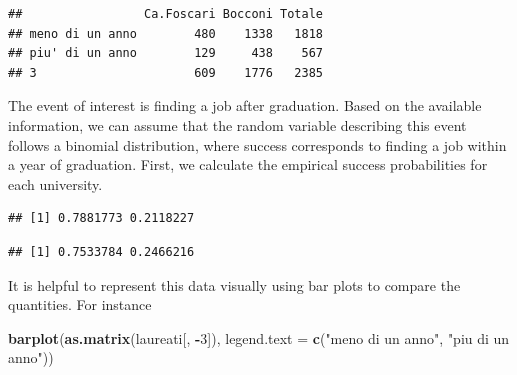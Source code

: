 \documentclass[
]{article}
\newenvironment{Shaded}{\begin{snugshade}}{\end{snugshade}}
\newcommand{\AttributeTok}[1]{\textcolor[rgb]{0.13,0.29,0.53}{#1}}
\newcommand{\DecValTok}[1]{\textcolor[rgb]{0.00,0.00,0.81}{#1}}
\newcommand{\FunctionTok}[1]{\textcolor[rgb]{0.13,0.29,0.53}{\textbf{#1}}}
\newcommand{\NormalTok}[1]{#1}
\newcommand{\OtherTok}[1]{\textcolor[rgb]{0.56,0.35,0.01}{#1}}
\newcommand{\SpecialCharTok}[1]{\textcolor[rgb]{0.81,0.36,0.00}{\textbf{#1}}}
\newcommand{\StringTok}[1]{\textcolor[rgb]{0.31,0.60,0.02}{#1}}
\begin{document}
\begin{verbatim}
##                 Ca.Foscari Bocconi Totale
## meno di un anno        480    1338   1818
## piu' di un anno        129     438    567
## 3                      609    1776   2385
\end{verbatim}

The event of interest is finding a job after graduation. Based on the
available information, we can assume that the random variable describing
this event follows a binomial distribution, where success corresponds to
finding a job within a year of graduation. First, we calculate the
empirical success probabilities for each university.

\begin{Shaded}
\end{Shaded}

\begin{verbatim}
## [1] 0.7881773 0.2118227
\end{verbatim}

\begin{Shaded}
\end{Shaded}

\begin{verbatim}
## [1] 0.7533784 0.2466216
\end{verbatim}

It is helpful to represent this data visually using bar plots to compare
the quantities. For instance

\begin{Shaded}
\begin{Highlighting}[]
\FunctionTok{barplot}\NormalTok{(}\FunctionTok{as.matrix}\NormalTok{(laureati[, }\SpecialCharTok{{-}}\DecValTok{3}\NormalTok{]), }\AttributeTok{legend.text =} \FunctionTok{c}\NormalTok{(}\StringTok{"meno di un anno"}\NormalTok{, }\StringTok{"piu\textquotesingle{} di un anno"}\NormalTok{))}
\end{Highlighting}
\end{Shaded}
\end{document}
